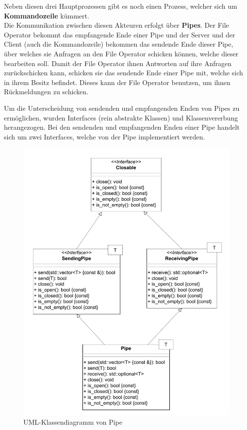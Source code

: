 Neben diesen drei Hauptprozessen gibt es noch einen Prozess, welcher sich um \textbf{Kommandozeile} kümmert. \\

Die Kommunikation zwischen diesen Akteuren erfolgt über \textbf{Pipes}. Der File Operator bekommt das empfangende Ende einer Pipe und der Server und der Client (auch 
die Kommandozeile) bekommen das sendende Ende dieser Pipe, über welches sie Anfragen an den File Operator schicken können, welche dieser bearbeiten soll. Damit der File
Operator ihnen Antworten auf ihre Anfragen zurückschicken kann, schicken sie das sendende Ende einer Pipe mit, welche sich in ihrem Besitz befindet. Dieses kann der File Operator
benutzen, um ihnen Rückmeldungen zu schicken.

Um die Unterscheidung von sendenden und empfangenden Enden von Pipes zu ermöglichen, wurden Interfaces (rein abstrakte Klassen) und Klassenvererbung herangezogen.
Bei den sendenden und empfangenden Enden einer Pipe handelt sich um zwei Interfaces, welche von der Pipe implementiert werden.

\begin{figure}
    \centering
    \includegraphics[width=\textwidth]{images/pipe_uml.pdf}
    \caption{UML-Klassendiagramm von Pipe}
    \label{fig:uml}
\end{figure}

